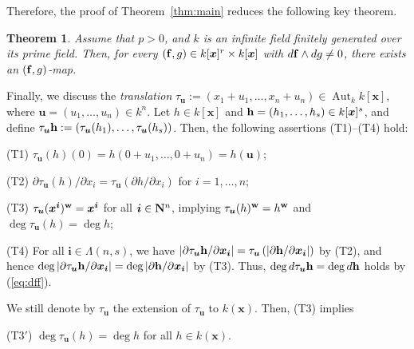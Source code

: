 \documentclass{amsart}
\theoremstyle{plain}
\newtheorem{thm}{Theorem}[section]
\theoremstyle{definition}
\newcommand{\Aut }{\mathop{\mathrm{Aut}}\nolimits}
\newcommand{\nd}{\noindent}
\newcommand{\N}{{\bf N}}
\newcommand{\x}{{\boldsymbol x}}
\newcommand{\w}{{\bf w}}
\newcommand{\bi}{{\boldsymbol i}}
\newcommand{\bu}{{\boldsymbol u}}
\newcommand{\ff}{{\bf f}}
\newcommand{\bh}{{\bf h}}
\newcommand{\kx}{k[\x]}
\newcommand{\kxr}{k(\x)}
\newcommand{\degw  }{\deg}
\begin{document}
Therefore, 
the proof of Theorem~\ref{thm:main} reduces the following key theorem.


\begin{thm}\label{thm:key}
Assume that $p>0$, 
and $k$ is an infinite field 
finitely generated over its prime field. 
Then, 
for every 
$(\ff ,g)\in \kx ^r\times \kx $ 
with $d\ff \wedge dg\ne 0$, 
there exists an $(\ff ,g)$-map. 
\end{thm}



Finally, 
we discuss 
the {\it translation} 
$\tau _{\bu }:=(x_1+u_1,\ldots ,x_n+u_n)\in \Aut _k\kx $, 
where $\bu =(u_1,\ldots ,u_n)\in k^n$. 
Let $h\in \kx $ and $\bh =(h_1,\ldots ,h_s)\in \kx ^s$, 
and define 
$\tau _{\bu }\bh :=(\tau _{\bu }(h_1),\ldots ,\tau _{\bu }(h_s))$. 
Then, the following assertions (T1)--(T4) hold: 



\nd (T1) 
$\tau _{\bu }(h)(0)=h(0+u_1,\ldots ,0+u_n)=h(\bu )$; 


\nd (T2) 
$\partial \tau _{\bu }(h)/\partial x_i
=\tau _{\bu }(\partial h/\partial x_i)$ 
for $i=1,\ldots ,n$; 





\nd (T3) 
$\tau _{\bu }(\x ^{\bi })^{\w }=\x ^{\bi }$ for all $\bi \in \N ^n$, 
implying 
$\tau _{\bu }(h)^{\w }=h^{\w }$ and $\degw \tau _{\bu }(h)=\degw h$; 


\nd (T4) 
For all $\bi \in \Lambda (n,s)$, 
we have $\left| 
\partial \tau _{\bu }\bh /
\partial \x _{\bi }\right|
=\tau _{\bu }\left( 
\left| \partial \bh /\partial \x _{\bi }\right| \right) $ 
by (T2), 
and hence 
$\degw \left| \partial \tau _{\bu }\bh /\partial \x _{\bi }\right|
=\degw 
\left| \partial \bh /\partial \x _{\bi }\right| $ 
by (T3). 
Thus, 
$\degw d\tau _{\bu }\bh =\degw d\bh$ holds by (\ref{eq:dff}). 


We still denote by $\tau _{\bu }$ 
the extension of $\tau _{\bu }$ to $\kxr $. 
Then, (T3) implies 


\nd (T3$'$) $\deg \tau _{\bu }(h)=\deg h$ for all $h\in \kxr $. 
\end{document}
